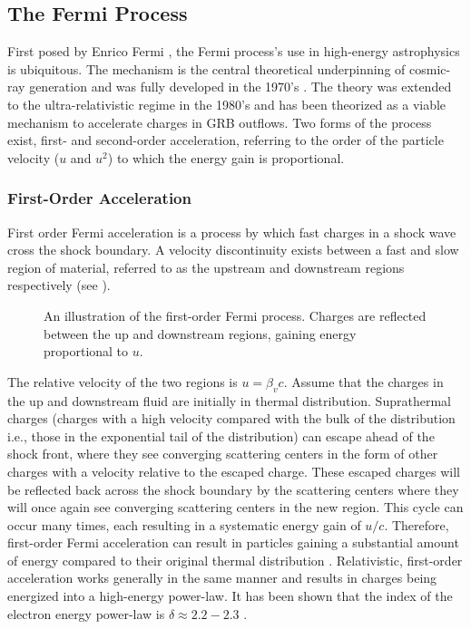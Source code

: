 \subsection{The Fermi Process}
\label{sec:pa::fp}
First posed by Enrico Fermi \cite{Fermi:1949}, the Fermi process's use
in high-energy astrophysics is ubiquitous. The mechanism is the
central theoretical underpinning of cosmic-ray generation and was
fully developed in the 1970's
\cite{Axford:1981,Krymskii:1977,Blandford:1978,Bell:1978b,Bell:1978a}. The
theory was extended to the ultra-relativistic regime in the 1980's
\cite{Kirk:1989,Kirk:1987} and has been theorized as a viable
mechanism to accelerate charges in GRB outflows. Two forms of the
process exist, first- and second-order acceleration, referring to the
order of the particle velocity ($u$ and $u^2$) to which the energy
gain is proportional.

\subsubsection{First-Order Acceleration}
First order Fermi acceleration is a process by which fast charges in a
shock wave cross the shock boundary. A velocity discontinuity exists
between a fast and slow region of material, referred to as the upstream
and downstream regions respectively (see ).
\begin{figure}[h]
  \centering
  \caption{An illustration of the
    first-order Fermi process. Charges are reflected between the up
    and downstream regions, gaining energy proportional to $u$. }
\label{fig:fermiaccel}
\end{figure}
The relative velocity of the two regions is $u=\beta_v c$.  Assume
that the charges in the up and downstream fluid are initially in
thermal distribution. Suprathermal charges (charges with a high
velocity compared with the bulk of the distribution i.e., those in the
exponential tail of the distribution) can escape ahead of the shock
front, where they see converging scattering centers in the form of
other charges with a velocity relative to the escaped charge. These
escaped charges will be reflected back across the shock boundary by
the scattering centers where they will once again see converging
scattering centers in the new region. This cycle can occur many times,
each resulting in a systematic energy gain of $u/c$. Therefore,
first-order Fermi acceleration can result in particles gaining a
substantial amount of energy compared to their original thermal
distribution \cite{longair}. Relativistic, first-order acceleration
works generally in the same manner and results in charges being
energized into a high-energy power-law. It has been shown that the
index of the electron energy power-law is $\delta \approx 2.2 -2.3$
\cite{Ostrowski:2002,Waxman:1997,Bednarz:1998,Achterberg:2001}.

